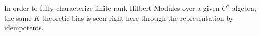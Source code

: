 In order to fully characterize finite rank Hilbert Modules over a given $C^*$-algebra, the same $K$-theoretic bias is seen right here through the representation by idempotents.



%
%

